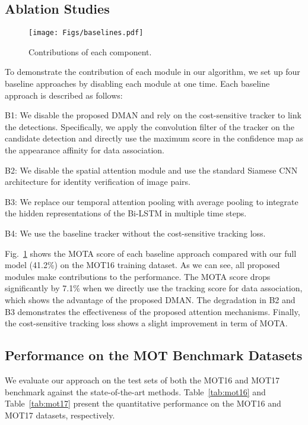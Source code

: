 \documentclass[runningheads]{llncs}
\begin{document}
  \subsection{Ablation Studies}
  \begin{figure}[t]
    \centering
    \texttt{[image: Figs/baselines.pdf]}\\
    \caption{Contributions of each component.}\label{fig:baselines}
  \end{figure}
  To demonstrate the contribution of each module in our algorithm, we set up four baseline approaches by disabling each module at one time. Each baseline approach is described as follows:
  
  B1: We disable the proposed DMAN and rely on the cost-sensitive tracker to link the detections. Specifically, we apply the convolution filter of the tracker on the candidate detection and directly use the maximum score in the confidence map as the appearance affinity for data association.
  
  B2: We disable the spatial attention module and use the standard Siamese CNN architecture for identity verification of image pairs.
  
  B3: We replace our temporal attention pooling with average pooling to integrate the hidden representations of the Bi-LSTM in multiple time steps.
  
  B4: We use the baseline tracker without the cost-sensitive tracking loss.
  
  Fig.~\ref{fig:baselines} shows the MOTA score of each baseline approach compared with our full model (41.2\%) on the MOT16 training dataset. As we can see, all proposed modules make contributions to the performance. The MOTA score drops significantly by 7.1\% when we directly use the tracking score for data association, which shows the advantage of the proposed DMAN. The degradation in B2 and B3 demonstrates the effectiveness of the proposed attention mechanisms. Finally, the cost-sensitive tracking loss shows a slight improvement in term of MOTA.
  
  \subsection{Performance on the MOT Benchmark Datasets}
  We evaluate our approach on the test sets of both the MOT16 and MOT17 benchmark against the state-of-the-art methods. Table~\ref{tab:mot16} and Table~\ref{tab:mot17} present the quantitative performance on the MOT16 and MOT17 datasets, respectively.
  
\end{document}
